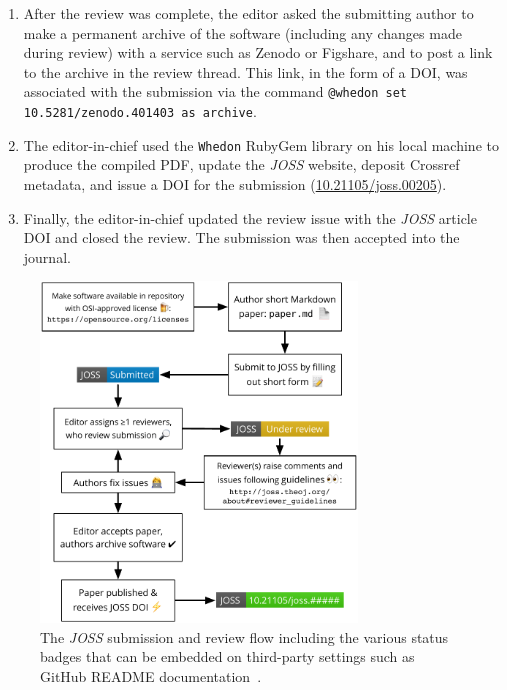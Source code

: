 \documentclass{article}
\newcommand\joss{\textit{JOSS}}
\begin{document}
\begin{enumerate}
Note that \joss{} reviews are subject to a code of conduct~\cite{code-of-conduct}, adopted from the Contributor Covenant Code of Conduct~\cite{contributor-covenant-coc}.
Both authors and reviewers must confirm that they have read and will adhere to this Code of Conduct, during submission and with their review, respectively.

\item After the review was complete, the editor asked the submitting author to make a permanent archive of the software (including any changes made during review) with a service such as Zenodo or Figshare, and to post a link to the archive in the review thread. This link, in the form of a DOI, was associated with the submission via the command \texttt{@whedon set 10.5281/zenodo.401403 as archive}.

\item The editor-in-chief used the \texttt{Whedon} RubyGem library on his local machine to produce the compiled PDF, update the \joss{} website, deposit Crossref metadata, and issue a DOI for the submission (\href{https://doi.org/10.21105/joss.00205}{10.21105/joss.00205}).

\item Finally, the editor-in-chief updated the review issue with the \joss{} article DOI and closed the review. The submission was then accepted into the journal.

\end{enumerate}


\begin{figure}[htp]
\centering
\includegraphics[width=0.75\textwidth]{JOSS-flowchart.pdf}
\caption{The \joss{} submission and review flow including the various status badges that can be embedded on third-party settings such as GitHub README documentation~\cite{JOSS-publication-workflow}.
\label{fig:submission-flow}}
\end{figure}
\end{document}
